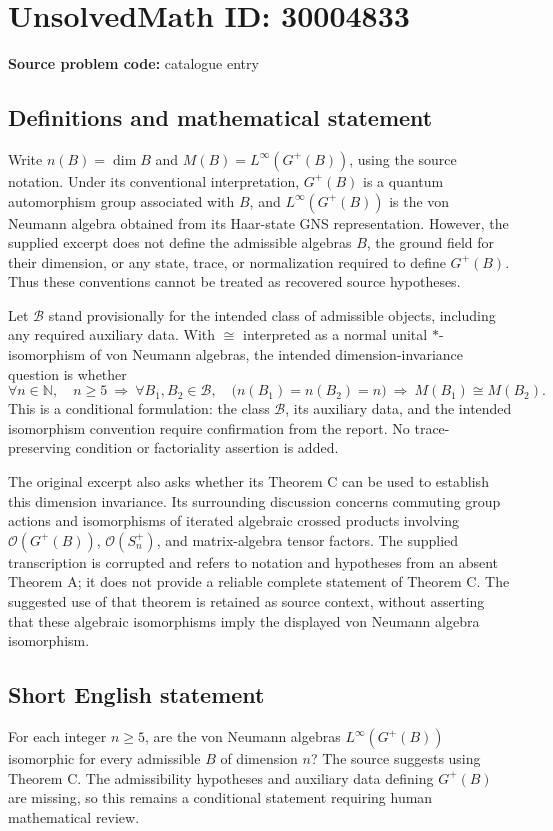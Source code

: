 \documentclass[11pt]{article}
\newcommand{\N}{\mathbb{N}}
\begin{document}
\section*{UnsolvedMath ID: 30004833}
\textbf{Source problem code:} catalogue entry
\subsection{Definitions and mathematical statement}
Write \(n(B)=\dim B\) and \(M(B)=L^\infty(G^+(B))\), using the source notation. Under its conventional interpretation, \(G^+(B)\) is a quantum automorphism group associated with \(B\), and \(L^\infty(G^+(B))\) is the von Neumann algebra obtained from its Haar-state GNS representation. However, the supplied excerpt does not define the admissible algebras \(B\), the ground field for their dimension, or any state, trace, or normalization required to define \(G^+(B)\). Thus these conventions cannot be treated as recovered source hypotheses.

Let \(\mathcal B\) stand provisionally for the intended class of admissible objects, including any required auxiliary data. With \(\cong\) interpreted as a normal unital \(*\)-isomorphism of von Neumann algebras, the intended dimension-invariance question is whether
\[
\forall n\in\N,\quad n\geq5\ \Longrightarrow\ 
\forall B_1,B_2\in\mathcal B,\quad
\bigl(n(B_1)=n(B_2)=n\bigr)
\ \Longrightarrow\ M(B_1)\cong M(B_2).
\]
This is a conditional formulation: the class \(\mathcal B\), its auxiliary data, and the intended isomorphism convention require confirmation from the report. No trace-preserving condition or factoriality assertion is added.

The original excerpt also asks whether its Theorem C can be used to establish this dimension invariance. Its surrounding discussion concerns commuting group actions and isomorphisms of iterated algebraic crossed products involving \(\mathcal O(G^+(B))\), \(\mathcal O(S_n^+)\), and matrix-algebra tensor factors. The supplied transcription is corrupted and refers to notation and hypotheses from an absent Theorem A; it does not provide a reliable complete statement of Theorem C. The suggested use of that theorem is retained as source context, without asserting that these algebraic isomorphisms imply the displayed von Neumann algebra isomorphism.
\subsection{Short English statement}
For each integer \(n\geq5\), are the von Neumann algebras \(L^\infty(G^+(B))\) isomorphic for every admissible \(B\) of dimension \(n\)? The source suggests using Theorem C. The admissibility hypotheses and auxiliary data defining \(G^+(B)\) are missing, so this remains a conditional statement requiring human mathematical review.
\end{document}

